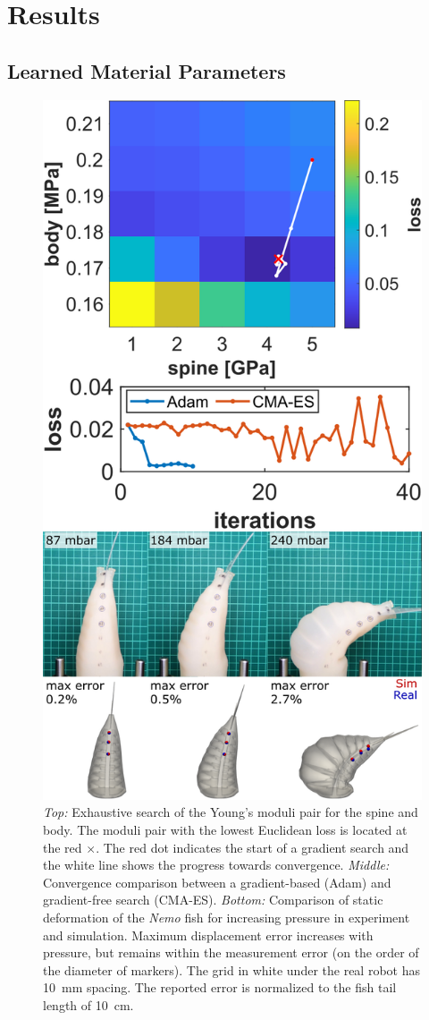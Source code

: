\section{Results}
\label{results}

\subsection{Learned Material Parameters}

\begin{figure}[t]
    \centering
    \includegraphics[width=0.85\columnwidth]{figures/grid_search_nemo_vertical_column.png}
    \caption{\textit{Top:} Exhaustive search of the Young's moduli pair for the spine and body. The moduli pair with the lowest Euclidean loss is located at the red $\times$. The red dot indicates the start of a gradient search and the white line shows the progress towards convergence. \textit{Middle:} Convergence comparison between a gradient-based (Adam) and gradient-free search (CMA-ES). \textit{Bottom:} Comparison of static deformation of the \emph{Nemo} fish for increasing pressure in experiment and simulation. Maximum displacement error increases with pressure, but remains within the measurement error (on the order of the diameter of markers). The grid in white under the real robot has \SI{10}{mm} spacing. The reported error is normalized to the fish tail length of \SI{10}{cm}.}

\end{figure}
